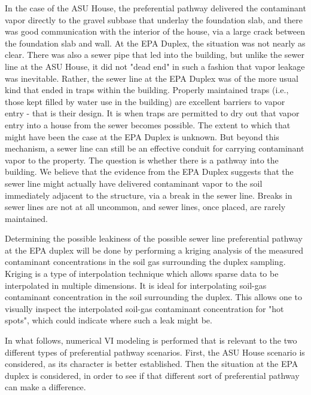 In the case of the ASU House, the preferential pathway delivered the contaminant vapor directly to the gravel subbase that underlay the foundation slab, and there was good communication with the interior of the house, via a large crack between the foundation slab and wall.
At the EPA Duplex, the situation was not nearly as clear.
There was also a sewer pipe that led into the building, but unlike the sewer line at the ASU House, it did not "dead end" in such a fashion that vapor leakage was inevitable.
Rather, the sewer line at the EPA Duplex was of the more usual kind that ended in traps within the building.
Properly maintained traps (i.e., those kept filled by water use in the building) are excellent barriers to vapor entry - that is their design.
It is when traps are permitted to dry out that vapor entry into a house from the sewer becomes possible.
The extent to which that might have been the case at the EPA Duplex is unknown.
But beyond this mechanism, a sewer line can still be an effective conduit for carrying contaminant vapor to the property.
The question is whether there is a pathway into the building. We believe that the evidence from the EPA Duplex suggests that the sewer line might actually have delivered contaminant vapor to the soil immediately adjacent to the structure, via a break in the sewer line.
Breaks in sewer lines are not at all uncommon, and sewer lines, once placed, are rarely maintained.\par

Determining the possible leakiness of the possible sewer line preferential pathway at the EPA duplex will be done by performing a kriging analysis of the measured contaminant concentrations in the soil gas surrounding the duplex sampling.
Kriging is a type of interpolation technique which allows sparse data to be interpolated in multiple dimensions.
It is ideal for interpolating soil-gas contaminant concentration in the soil surrounding the duplex.
This allows one to visually inspect the interpolated soil-gas contaminant concentration for "hot spots", which could indicate where such a leak might be.\par

In what follows, numerical VI modeling is performed that is relevant to the two different types of preferential pathway scenarios.
First, the ASU House scenario is considered, as its character is better established.
Then the situation at the EPA duplex is considered, in order to see if that different sort of preferential pathway can make a difference.\par

